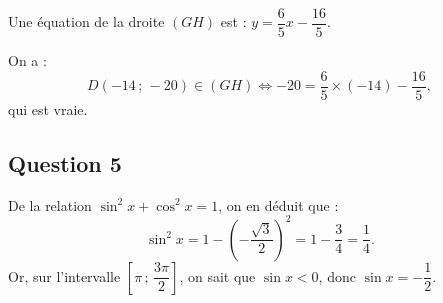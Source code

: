 \documentclass[10pt]{article}
\begin{document}
Une équation de la droite \( (GH) \) est : \( y = \dfrac{6}{5}x - \dfrac{16}{5} \).

On a :
\[
D(-14 \,;\, -20) \in (GH) \iff -20 = \dfrac{6}{5} \times (-14) - \dfrac{16}{5},
\]
qui est vraie.


\subsection*{Question 5}

De la relation \( \sin^2 x + \cos^2 x = 1 \), on en déduit que :
\[
\sin^2 x = 1 - \left( -\dfrac{\sqrt{3}}{2} \right)^2 = 1 - \dfrac{3}{4} = \dfrac{1}{4}.
\]
Or, sur l'intervalle \( \left[ \pi \,;\, \dfrac{3\pi}{2} \right] \), on sait que \( \sin x < 0 \), donc \( \sin x = -\dfrac{1}{2} \).
\end{document}
